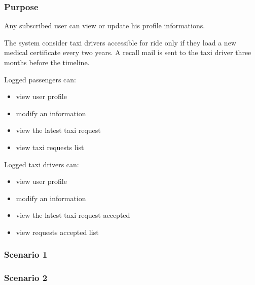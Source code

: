 \label{user-profile}
\subsubsection{Purpose}
Any subscribed user can view or update his profile informations. 

The system consider taxi drivers accessible for ride only if they load a new medical certificate every two years. A recall mail is sent to the taxi driver three months before the timeline.


Logged passengers can:
\begin{itemize}
\item view user profile
\item modify an information
\item view the latest taxi request
\item view taxi requests list
\end{itemize}

Logged taxi drivers can:
\begin{itemize}
\item view user profile
\item modify an information
\item view the latest taxi request accepted
\item view requests accepted list
\end{itemize}


\subsubsection{Scenario 1}


\subsubsection{Scenario 2}






